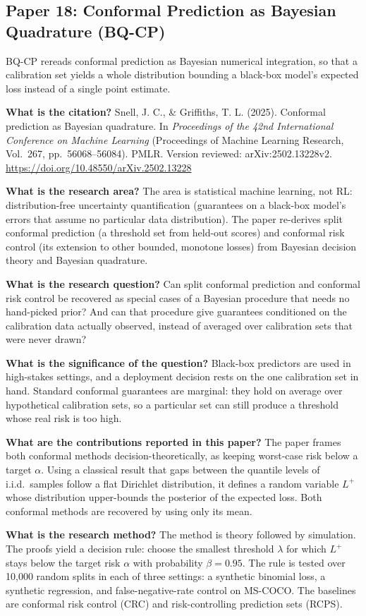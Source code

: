 \documentclass[11pt]{article}
\newcommand{\paper}[1]{\subsection*{#1}}
\newcommand{\q}[2]{\item \textbf{#1} #2}
\begin{document}
\paper{Paper 18: Conformal Prediction as Bayesian Quadrature (BQ-CP)}
BQ-CP rereads conformal prediction as Bayesian numerical integration, so that a calibration set yields a whole distribution bounding a black-box model's expected loss instead of a single point estimate.
\begin{qna}

\q{What is the citation?}
Snell, J. C., \& Griffiths, T. L. (2025). Conformal prediction as Bayesian quadrature. In \emph{Proceedings of the 42nd International Conference on Machine Learning} (Proceedings of Machine Learning Research, Vol.\ 267, pp.\ 56068--56084). PMLR. Version reviewed: arXiv:2502.13228v2. \url{https://doi.org/10.48550/arXiv.2502.13228}

\q{What is the research area?}
The area is statistical machine learning, not RL: distribution-free uncertainty quantification (guarantees on a black-box model's errors that assume no particular data distribution). The paper re-derives split conformal prediction (a threshold set from held-out scores) and conformal risk control (its extension to other bounded, monotone losses) from Bayesian decision theory and Bayesian quadrature.

\q{What is the research question?}
Can split conformal prediction and conformal risk control be recovered as special cases of a Bayesian procedure that needs no hand-picked prior? And can that procedure give guarantees conditioned on the calibration data actually observed, instead of averaged over calibration sets that were never drawn?

\q{What is the significance of the question?}
Black-box predictors are used in high-stakes settings, and a deployment decision rests on the one calibration set in hand. Standard conformal guarantees are marginal: they hold on average over hypothetical calibration sets, so a particular set can still produce a threshold whose real risk is too high.

\q{What are the contributions reported in this paper?}
The paper frames both conformal methods decision-theoretically, as keeping worst-case risk below a target $\alpha$. Using a classical result that gaps between the quantile levels of i.i.d.\ samples follow a flat Dirichlet distribution, it defines a random variable $L^+$ whose distribution upper-bounds the posterior of the expected loss. Both conformal methods are recovered by using only its mean.

\q{What is the research method?}
The method is theory followed by simulation. The proofs yield a decision rule: choose the smallest threshold $\lambda$ for which $L^+$ stays below the target risk $\alpha$ with probability $\beta = 0.95$. The rule is tested over 10,000 random splits in each of three settings: a synthetic binomial loss, a synthetic regression, and false-negative-rate control on MS-COCO. The baselines are conformal risk control (CRC) and risk-controlling prediction sets (RCPS).


\end{qna}
\end{document}
